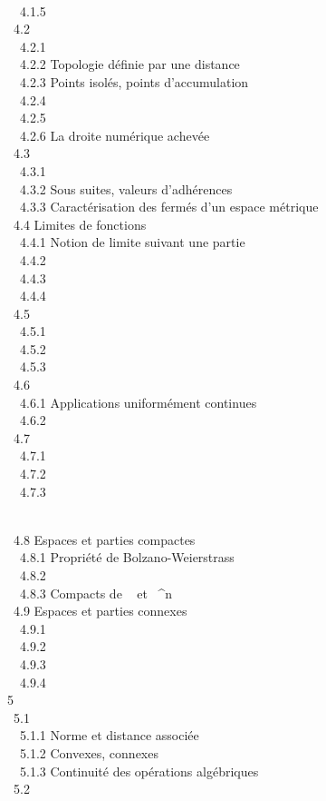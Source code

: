 \documentclass[]{article}
\begin{document}
\\ ~~4.1.5  \\
~4.2  \\ ~~4.2.1
 \\ ~~4.2.2
{Topologie définie par une
distance} \\ ~~4.2.3 {Points
isolés, points d'accumulation} \\ ~~4.2.4
 \\
~~4.2.5 
\\ ~~4.2.6 {La droite numérique
achevée} \\ ~4.3  \\ ~~4.3.1
 \\
~~4.3.2 {Sous suites, valeurs
d'adhérences} \\ ~~4.3.3
{Caractérisation des fermés d'un
espace métrique} \\ ~4.4 {Limites de
fonctions} \\ ~~4.4.1 {Notion de
limite suivant une partie} \\ ~~4.4.2
 \\
~~4.4.3 
\\ ~~4.4.4  \\
~4.5  \\ ~~4.5.1
 \\
~~4.5.2 
\\ ~~4.5.3  \\
~4.6  \\
~~4.6.1 {Applications uniformément
continues} \\ ~~4.6.2
 \\
~4.7  \\ ~~4.7.1
 \\ ~~4.7.2
 \\ ~~4.7.3

\\ ~4.8 {Espaces et parties
compactes} \\ ~~4.8.1 {Propriété
de Bolzano-Weierstrass} \\ ~~4.8.2
 \\
~~4.8.3 {Compacts de ~ et
~^n} \\ ~4.9 {Espaces et
parties connexes} \\ ~~4.9.1
 \\ ~~4.9.2
 \\
~~4.9.3  \\ ~~4.9.4
 \\ 5
 \\ ~5.1
 \\
~~5.1.1 {Norme et distance
associée} \\ ~~5.1.2 {Convexes,
connexes} \\ ~~5.1.3 {Continuité
des opérations algébriques} \\ ~5.2
\end{document}
